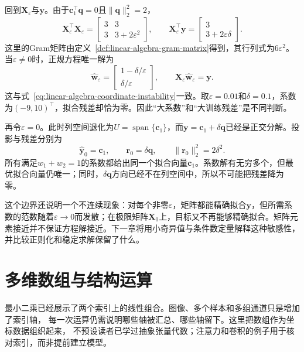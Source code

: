 回到$\bm{X}_{\varepsilon}$与$\bm{y}$。由于$\bm{c}_1^{\top}\bm{q}=0$且$\lVert\bm{q}\rVert_2^2=2$，
\[
  \bm{X}_{\varepsilon}^{\top}\bm{X}_{\varepsilon}
  =
  \begin{bmatrix} 3&3\\ 3&3+2\varepsilon^2 \end{bmatrix},
  \qquad
  \bm{X}_{\varepsilon}^{\top}\bm{y}
  =
  \begin{bmatrix} 3\\ 3+2\varepsilon\delta \end{bmatrix}.
\]
这里的Gram矩阵由定义~\ref{def:linear-algebra-gram-matrix}得到，其行列式为$6\varepsilon^2$。当$\varepsilon\neq0$时，正规方程唯一解为
\begin{equation}
  \widehat{\bm{w}}_{\varepsilon} = \begin{bmatrix} 1-\delta/\varepsilon\\ \delta/\varepsilon \end{bmatrix}, \qquad \bm{X}_{\varepsilon}\widehat{\bm{w}}_{\varepsilon} = \bm{y}. \label{eq:linear-algebra-nearly-collinear-least-squares}
\end{equation}
这与式~\eqref{eq:linear-algebra-coordinate-instability}一致。取$\varepsilon=0.01$和$\delta=0.1$，系数为$(-9,10)^{\top}$，拟合残差却恰为零。因此“大系数”和“大训练残差”是不同判断。

再令$\varepsilon=0$。此时列空间退化为$U=\operatorname{span}\{\bm{c}_1\}$，而$\bm{y}=\bm{c}_1+\delta\bm{q}$已经是正交分解。投影与残差分别为
\[
  \widehat{\bm{y}}_0=\bm{c}_1,
  \qquad
  \bm{r}_0=\delta\bm{q},
  \qquad
  \lVert\bm{r}_0\rVert_2^2=2\delta^2.
\]
所有满足$w_1+w_2=1$的系数都给出同一个拟合向量$\bm{c}_1$。系数解有无穷多个，但最优拟合向量仍唯一；同时，$\delta\bm{q}$方向已经不在列空间中，所以不可能把残差降为零。

这个边界还说明一个不连续现象：对每个非零$\varepsilon$，矩阵都能精确拟合$\bm{y}$，但所需系数的范数随着$\varepsilon\to0$而发散；在极限矩阵$\bm{X}_0$上，目标又不再能够精确拟合。矩阵元素接近并不保证方程解接近。下一章将用小奇异值与条件数定量解释这种敏感性，并比较正则化和稳定求解保留了什么。

\section{多维数组与结构运算}
\label{sec:linear-algebra-tensors-structured-operations}

最小二乘已经展示了两个索引上的线性组合。图像、多个样本和多组通道只是增加了索引轴，
每一次运算仍需说明哪些轴被汇总、哪些轴留下。这里把数组作为坐标数据组织起来，
不预设读者已学过抽象张量代数；注意力和卷积的例子用于核对索引，而非提前建立模型。

